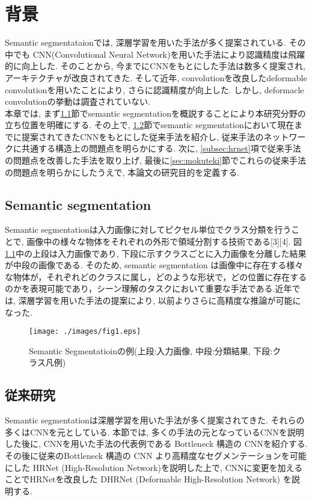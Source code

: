 \chapter{背景}\label{chap:haikei}
Semantic segmentataionでは, 深層学習を用いた手法が多く提案されている. その中でも CNN(Convolutional Neural Network)\cite{cnn}を用いた手法により認識精度は飛躍的に向上した. そのことから, 今までにCNNをもとにした手法は数多く提案され, アーキテクチャが改良されてきた. そして近年, convolutionを改良したdeformable convolution\cite{defconv}を用いたことにより, さらに認識精度が向上した. しかし, deformacle convolutionの挙動は調査されていない. \\
本章では, まず\ref{chap:semantic}節でsemantic segmentationを概説することにより本研究分野の立ち位置を明確にする. その上で, \ref{sec:zyuurai}節でsemantic segmentationにおいて現在までに提案されてきたCNNをもとにした従来手法を紹介し, 従来手法のネットワークに共通する構造上の問題点を明らかにする. 次に, \ref{subsec:hrnet}項で従来手法の問題点を改善した手法を取り上げ, 最後に\ref{sec:mokuteki}節でこれらの従来手法の問題点を明らかにしたうえで, 本論文の研究目的を定義する.


\section{Semantic segmentation}\label{chap:semantic}
Semantic segmentationは入力画像に対してピクセル単位でクラス分類を行うことで, 画像中の様々な物体をそれぞれの外形で領域分割する技術である[3][4]. 図\ref{fig:seg_rei}中の上段は入力画像であり, 下段に示すクラスごとに入力画像を分離した結果が中段の画像である. そのため, semantic segmentation は画像中に存在する様々な物体が，それぞれどのクラスに属し，どのような形状で，どの位置に存在するのかを表現可能であり，シーン理解のタスクにおいて重要な手法である.近年では, 深層学習を用いた手法の提案により, 以前よりさらに高精度な推論が可能になった\cite{long2015fully}. 



\begin{figure}[H]
    \centering
    \texttt{[image: ./images/fig1.eps]}
    \caption{Semantic Segmentatioinの例(上段:入力画像, 中段:分類結果, 下段:クラス凡例)\cite{semaseg2}}
    \label{fig:seg_rei}
\end{figure}

\section{従来研究}\label{sec:zyuurai}
Semantic segmentationは深層学習を用いた手法が多く提案されてきた. それらの多くはCNNを元としている. 本節では, 多くの手法の元となっているCNNを説明した後に, CNNを用いた手法の代表例である Bottleneck 構造の CNNを紹介する.  その後に従来のBottleneck 構造の CNN より高精度なセグメンテーションを可能にした HRNet (High-Resolution Network)\cite{hrnet}を説明した上で,  CNNに変更を加えることでHRNetを改良した DHRNet (Deformable High-Resolution Network)\cite{dhrnet} を説明する.

